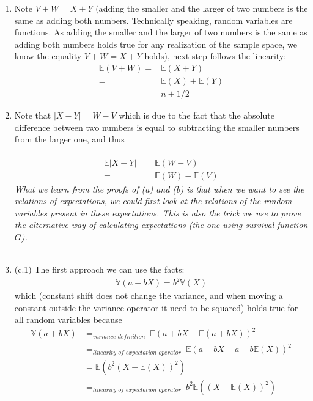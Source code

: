 
\setcounter{theorem}{20}
\begin{exercise} [BH.4.21]
\begin{solution}
    \begin{enumerate}
	    \item Note $V+W=X+Y$ (adding the smaller and the larger of two numbers
		is the same as adding both numbers. Technically speaking, random variables are functions. As adding the smaller and the larger of two numbers
		is the same as adding both numbers holds true for any realization of the sample space, we know the equality $V+W=X+Y$ holds), next step follows the linearity:\\
		\begin{align*}
			\mathbb{E}(V+W)=&\mathbb{E}(X+Y)\\
			=&\mathbb{E}(X)+\mathbb{E}(Y)\\
			=& n+1/2
		\end{align*}
		\item Note that $|X-Y|=W-V$ which is due to the fact that the absolute difference between two numbers is equal to subtracting the smaller numbers from the larger one, and thus  \\~\\
		\begin{align*}
			\mathbb{E}|X-Y|=&\mathbb{E}(W-V)\\
			=&\mathbb{E}(W)-\mathbb{E}(V) 
		\end{align*}
		\textit{What we learn from the proofs of (a) and (b) is that when we want to see the relations of expectations, we could first look at the relations of the random variables present in these expectations. This is also the trick we use to prove the alternative way of calculating expectations (the one using survival function $G$). }\\~\\
		\item  (c.1) The first approach we can use the facts: \begin{align*}
			\mathbb{V}(a+bX)=b^2\mathbb{V}(X)
		\end{align*} 
		which (constant shift does not change the variance, and when moving a constant outside the variance operator it need to  be squared) holds true for all random variables because 
		\begin{align*}
			\mathbb{V}(a+bX)&=_{\textit{variance definition~}} \mathbb{E}\left( a+bX -\mathbb{E}(a+bX) \right)^2 \\&=_{\textit{linearity of expectation operator~}} \mathbb{E}\left( a+bX -a-b\mathbb{E}(X) \right)^2 \\ &=  \mathbb{E}\left(b^2\left( X -\mathbb{E}(X) \right)^2\right) \\ &=_{\textit{linearity of expectation operator~}} b^2\mathbb{E}\left(\left( X -\mathbb{E}(X) \right)^2\right) \\ 

\end{align*}
\end{enumerate}
\end{solution}
\end{exercise}
